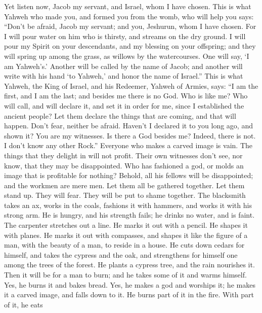  Yet listen now, Jacob my servant, and Israel, whom I have
chosen.  This is what Yahweh who made you, and formed you
from the womb, who will help you says: ``Don't be afraid, Jacob my
servant; and you, Jeshurun, whom I have chosen.  For I will
pour water on him who is thirsty, and streams on the dry ground. I will
pour my Spirit on your descendants, and my blessing on your offspring;
 and they will spring up among the grass, as willows by the
watercourses.  One will say, `I am Yahweh's.' Another will
be called by the name of Jacob; and another will write with his hand `to
Yahweh,' and honor the name of Israel.''  This is what
Yahweh, the King of Israel, and his Redeemer, Yahweh of Armies, says:
``I am the first, and I am the last; and besides me there is no God.
 Who is like me? Who will call, and will declare it, and set
it in order for me, since I established the ancient people? Let them
declare the things that are coming, and that will happen. 
Don't fear, neither be afraid. Haven't I declared it to you long ago,
and shown it? You are my witnesses. Is there a God besides me? Indeed,
there is not. I don't know any other Rock.''  Everyone who
makes a carved image is vain. The things that they delight in will not
profit. Their own witnesses don't see, nor know, that they may be
disappointed.  Who has fashioned a god, or molds an image
that is profitable for nothing?  Behold, all his fellows
will be disappointed; and the workmen are mere men. Let them all be
gathered together. Let them stand up. They will fear. They will be put
to shame together.  The blacksmith takes an ax, works in
the coals, fashions it with hammers, and works it with his strong arm.
He is hungry, and his strength fails; he drinks no water, and is faint.
 The carpenter stretches out a line. He marks it out with a
pencil. He shapes it with planes. He marks it out with compasses, and
shapes it like the figure of a man, with the beauty of a man, to reside
in a house.  He cuts down cedars for himself, and takes the
cypress and the oak, and strengthens for himself one among the trees of
the forest. He plants a cypress tree, and the rain nourishes it.
 Then it will be for a man to burn; and he takes some of it
and warms himself. Yes, he burns it and bakes bread. Yes, he makes a god
and worships it; he makes it a carved image, and falls down to it.
 He burns part of it in the fire. With part of it, he eats
